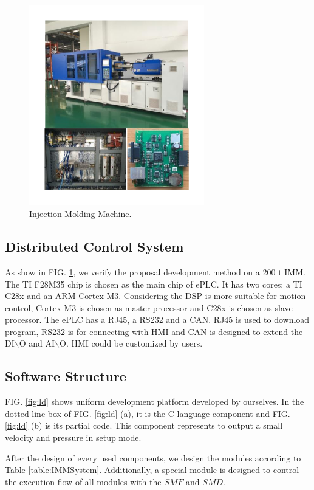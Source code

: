 \documentclass[journal,UTF8]{IEEEtran}
\begin{document}
\begin{figure}
	\centering
	\includegraphics[width=3in]{fig/FIG10.pdf}
	\caption{Injection Molding Machine.}
	\label{fig:IMM}
\end{figure}

\subsection{Distributed Control System}
As show in FIG. \ref{fig:IMM}, we verify the proposal development method on a 200 t IMM. The TI F28M35 chip is chosen as the main chip of ePLC. It has two cores: a TI C28x and an ARM Cortex M3. Considering the DSP is more suitable for motion control, Cortex M3 is chosen as master processor and C28x is chosen as slave processor. The ePLC has a RJ45, a RS232 and a CAN. RJ45 is used to download program, RS232 is for connecting with HMI and CAN is designed to extend the DI$\backslash$O and AI$\backslash$O. HMI could be customized by users.

\subsection{Software Structure}
FIG. \ref{fig:ld} shows uniform development platform developed by ourselves. In the dotted line box of FIG. \ref{fig:ld} (a), it is the C language component and FIG. \ref{fig:ld} (b) is its partial code. This component represents to output a small velocity and pressure in setup mode.

After the design of every used components, we design the modules according to Table \ref{table:IMMSystem}. Additionally, a special module is designed to control the execution flow of all modules with the $SMF$ and $SMD$.
\end{document}
